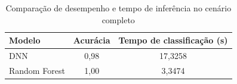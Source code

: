 \begin{table}[H]
  \centering
  \small
  \begin{tabular}{lcc}
    \hline
    \textbf{Modelo} & \textbf{Acurácia} & \textbf{Tempo de classificação (s)} \\ \hline
    DNN             & 0,98              & 17,3258                             \\
    Random Forest   & 1,00              & 3,3474                              \\ \hline
  \end{tabular}
  \caption{Comparação de desempenho e tempo de inferência no cenário completo}
  \label{tab:total_completo_tempo_de_classificacao}
\end{table}
